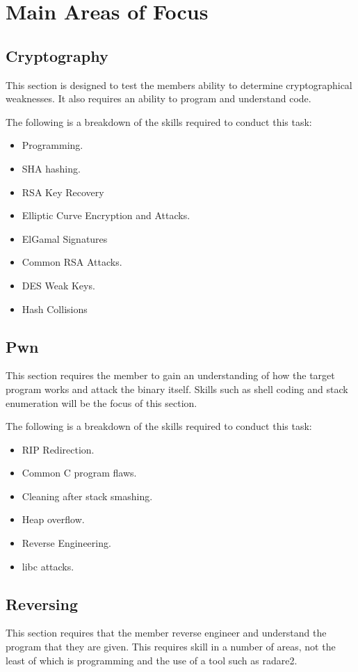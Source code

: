 \documentclass[a4paper,11pt]{report}
\begin{document}
	\section{Main Areas of Focus}
		\subsection{Cryptography}
			This section is designed to test the members ability to determine cryptographical weaknesses. 
			It also requires an ability to program and understand code. 
			
			The following is a breakdown of the skills required to conduct this task:
			\begin{itemize}
				\item Programming.
				\item SHA hashing. 
				\item RSA Key Recovery
				\item Elliptic Curve Encryption and Attacks.
				\item ElGamal Signatures
				\item Common RSA Attacks. 
				\item DES Weak Keys. 
				\item Hash Collisions
			\end{itemize}
		\subsection{Pwn}
			This section requires the member to gain an understanding of how the target program works and attack the binary itself. 
			Skills such as shell coding and stack enumeration will be the focus of this section. 

			The following is a breakdown of the skills required to conduct this task:
			\begin{itemize}
				\item RIP Redirection. 
				\item Common C program flaws. 
				\item Cleaning after stack smashing. 
				\item Heap overflow. 
				\item Reverse Engineering.
				\item libc attacks. 
			\end{itemize}
		\subsection{Reversing}
			This section requires that the member reverse engineer and understand the program that they are given. 
			This requires skill in a number of areas, not the least of which is programming and the use of a tool such as radare2. 
\end{document}
